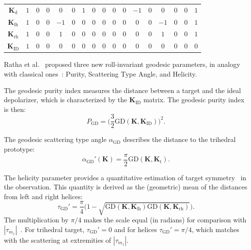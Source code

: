 \documentclass[journal]{IEEEtran}
\begin{document}
\begin{table}[hbt]
\begin{tabular}{*{17}{c}}
			$\bm K_{\text{d}}$ &
			$1$ & $0$ & $0$ & $0$
			& $0$ & $1$ & $0$ & $0$
			& $0$ & $0$ & $-1$ & $0$
			& $0$ & $0$ & $0$ & $1$ \\
			$ \bm K_{\text{lh}}$
			& $1$ & $0$ & $0$ & $-1$
			& $0$ & $0$ & $0$ & $0$
			& $0$ & $0$ & $0$ & $0$
			& $-1$ & $0$ & $0$ & $1$\\
			$ \bm K_{\text{rh}}$
			& $1$ & $0$ & $0$ & $1$
			& $0$ & $0$ & $0$ & $0$
			& $0$ & $0$ & $0$ & $0$
			& $1$ & $0$ & $0$ & $1$\\
			$\bm{K}_{\text{ID}}$
			& $1$ & $0$ & $0$ & $0$
			& $0$ & $0$ & $0$ & $0$
			& $0$ & $0$ & $0$ & $0$
			& $0$ & $0$ & $0$ & $0$ \\
			\bottomrule
		\end{tabular}
	\end{table}
	
	Ratha et al.~\cite{APolSARScatteringPowerFactorizationFrameworkandNovelRollInvariantParametersBasedUnsupervisedClassificationSchemeUsingaGeodesicDistanceinpress} proposed three new roll-invariant geodesic parameters, in analogy with classical ones~\cite{gil85,CloudePottier:97,Touzi:TGARS:2007}: Purity, Scattering Type Angle, and Helicity.%
	
	The geodesic purity index measures the distance between a target and the ideal depolarizer, which is characterized by the $\bm{K}_{\text{ID}}$ matrix.
	The geodesic purity index is then:
	\begin{equation}
		P_{\text{GD}} = \Big(\frac{3}{2}\text{GD}(\bm{K}, \bm{K}_{\text{ID}})\Big)^2.
	\end{equation}
	
	The geodesic scattering type angle $\alpha_{\text{GD}}$ describes 
	the distance to the trihedral prototype:
	\begin{equation}
		\alpha_{\text{GD}}'(\bm{K}) = \frac{\pi}{2}  \text{GD}(\bm{K},\bm{K}_{\text{t}}).
	\end{equation}
	
	The helicity parameter provides a quantitative estimation of target symmetry~\cite{Touzi:TGARS:2007} in the observation. 
	This quantity is derived as the (geometric) mean of the distances from left and right helices:
	\begin{equation}
		\tau_{\text{GD}}' = \frac\pi4 \big(1 - \sqrt{\text{GD}(\bm{K},\bm{K}_{\text{lh}})\text{GD}(\bm{K},\bm{K}_{\text{rh}})}\big).
	\end{equation}
	The multiplication by $\pi/4$ makes the scale equal (in radians) for comparison with $|\tau_{m_1}|$~\cite{Touzi:TGARS:2007}. 
	For trihedral target, $\tau_{\text{GD}}' = 0$ and for helices $\tau_{\text{GD}}' = \pi/4$, which matches with the scattering at extremities of $|\tau_{m_1}|$.
	
\end{document}
